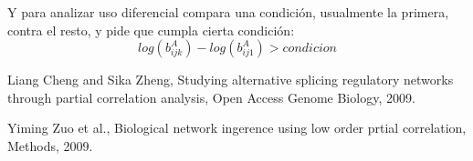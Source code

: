 \documentclass[a4paper,10pt]{book}
\begin{document}
Y para analizar uso diferencial compara una condición, usualmente la primera, contra el resto, y pide que cumpla cierta condición:
\begin{equation} \label{eq:uso_diferencial_aspli}
log(b_{ijk}^A)-log(b_{ij1}^A) > condicion
\end{equation}
\begin{thebibliography}{99}

  Liang Cheng and Sika Zheng,
  Studying alternative splicing regulatory networks through partial correlation analysis,
  Open Access Genome Biology, 2009.

  Yiming Zuo et al.,
  Biological network ingerence using low order prtial correlation,
  Methods, 2009.

  
\end{thebibliography}
\end{document}
